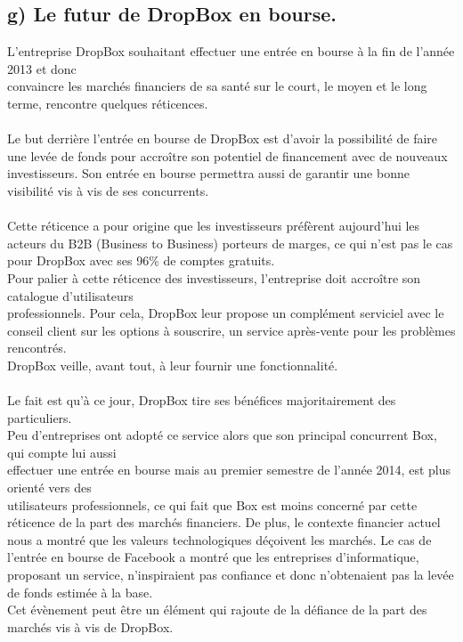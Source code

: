 \documentclass[a4paper, 10pt]{article}
\begin{document}
\subsection*{g) Le futur de DropBox en bourse.}
L'entreprise DropBox souhaitant effectuer une entrée en bourse à la fin de l'année 2013 et
donc\\convaincre les marchés financiers de sa santé sur le court, le moyen et le long terme, rencontre quelques réticences.\\ \\
Le but derrière l'entrée en bourse de DropBox est d'avoir la possibilité de faire une levée de fonds
pour accroître son potentiel de financement avec de nouveaux investisseurs.
Son entrée en bourse permettra aussi de garantir une bonne visibilité vis à vis de ses concurrents.\\ \\
Cette réticence a pour origine que les investisseurs préfèrent aujourd'hui les acteurs du B2B (Business to Business) porteurs de marges,
ce qui n'est pas le cas pour DropBox avec ses 96\% de comptes gratuits.\\
Pour palier à cette réticence des investisseurs, l'entreprise doit accroître son catalogue d'utilisateurs\\professionnels.
Pour cela, DropBox leur propose un complément serviciel avec le conseil client sur les options à souscrire,
un service après-vente pour les problèmes rencontrés.\\
DropBox veille, avant tout, à leur fournir une fonctionnalité.\\ \\
Le fait est qu'à ce jour, DropBox tire ses bénéfices majoritairement des particuliers.\\
Peu d'entreprises ont adopté ce service alors que son principal concurrent Box,
qui compte lui aussi\\effectuer une entrée en bourse mais au premier semestre de l'année 2014,
est plus orienté vers des\\utilisateurs professionnels,
ce qui fait que Box est moins concerné par cette réticence de la part des marchés financiers.
\newpage
\noindent
De plus, le contexte financier actuel nous a montré que les valeurs technologiques déçoivent les marchés.
Le cas de l'entrée en bourse de Facebook a montré que les entreprises d'informatique, proposant un service,
n'inspiraient pas confiance et donc n'obtenaient pas la levée de fonds estimée à la base.\\
Cet évènement peut être un élément qui rajoute de la défiance de la part des marchés vis à vis de DropBox.
\end{document}
